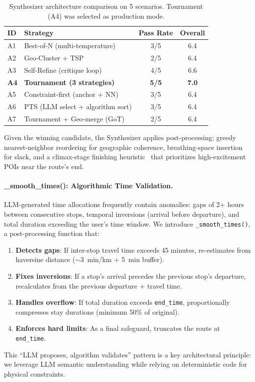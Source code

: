 \begin{table}[H]
\centering
\caption{Synthesizer architecture comparison on 5 scenarios. Tournament (A4) was selected as production mode.}
\label{tab:synthesizer_ablation}
\begin{tabular}{@{}llcc@{}}
\toprule
\textbf{ID} & \textbf{Strategy} & \textbf{Pass Rate} & \textbf{Overall} \\
\midrule
A1 & Best-of-N (multi-temperature) & 3/5 & 6.4 \\
A2 & Geo-Cluster + TSP & 2/5 & 6.4 \\
A3 & Self-Refine (critique loop) & 4/5 & 6.6 \\
\textbf{A4} & \textbf{Tournament (3 strategies)} & \textbf{5/5} & \textbf{7.0} \\
A5 & Constraint-first (anchor + NN) & 3/5 & 6.4 \\
\midrule
A6 & PTS (LLM select + algorithm sort) & 3/5 & 6.4 \\
A7 & Tournament + Geo-merge (GoT) & 2/5 & 6.4 \\
\bottomrule
\end{tabular}
\end{table}

Given the winning candidate, the Synthesizer applies post-processing: greedy nearest-neighbor reordering for geographic coherence, breathing-space insertion for slack, and a climax-stage finishing heuristic~\cite{kahneman1993when} that prioritizes high-excitement POIs near the route's end.

\paragraph{\_smooth\_times(): Algorithmic Time Validation.}

LLM-generated time allocations frequently contain anomalies: gaps of 2+ hours between consecutive stops, temporal inversions (arrival before departure), and total duration exceeding the user's time window. We introduce \texttt{\_smooth\_times()}, a post-processing function that:

\begin{enumerate}[leftmargin=*]
    \item \textbf{Detects gaps}: If inter-stop travel time exceeds 45 minutes, re-estimates from haversine distance ($\sim$3~min/km + 5~min buffer).
    \item \textbf{Fixes inversions}: If a stop's arrival precedes the previous stop's departure, recalculates from the previous departure + travel time.
    \item \textbf{Handles overflow}: If total duration exceeds \texttt{end\_time}, proportionally compresses stay durations (minimum 50\% of original).
    \item \textbf{Enforces hard limits}: As a final safeguard, truncates the route at \texttt{end\_time}.
\end{enumerate}

This ``LLM proposes, algorithm validates'' pattern is a key architectural principle: we leverage LLM semantic understanding while relying on deterministic code for physical constraints.
